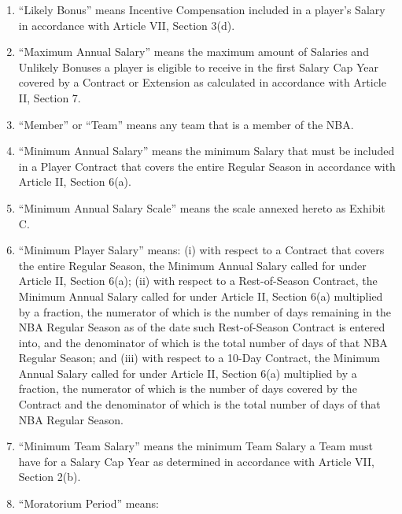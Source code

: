 \documentclass[
]{book}
\begin{document}
\begin{enumerate}
\item
  ``Likely Bonus'' means Incentive Compensation included in a player's Salary in accordance with Article VII, Section 3(d).
\item
  ``Maximum Annual Salary'' means the maximum amount of Salaries and Unlikely Bonuses a player is eligible to receive in the first Salary Cap Year covered by a Contract or Extension as calculated in accordance with Article II, Section 7.
\item
  ``Member'' or ``Team'' means any team that is a member of the NBA.
\item
  ``Minimum Annual Salary'' means the minimum Salary that must be included in a Player Contract that covers the entire Regular Season in accordance with Article II, Section 6(a).
\item
  ``Minimum Annual Salary Scale'' means the scale annexed hereto as Exhibit C.
\item
  ``Minimum Player Salary'' means: (i) with respect to a Contract that covers the entire Regular Season, the Minimum Annual Salary called for under Article II, Section 6(a); (ii) with respect to a Rest-of-Season Contract, the Minimum Annual Salary called for under Article II, Section 6(a) multiplied by a fraction, the numerator of which is the number of days remaining in the NBA Regular Season as of the date such Rest-of-Season Contract is entered into, and the denominator of which is the total number of days of that NBA Regular Season; and (iii) with respect to a 10-Day Contract, the Minimum Annual Salary called for under Article II, Section 6(a) multiplied by a fraction, the numerator of which is the number of days covered by the Contract and the denominator of which is the total number of days of that NBA Regular Season.
\item
  ``Minimum Team Salary'' means the minimum Team Salary a Team must have for a Salary Cap Year as determined in accordance with Article VII, Section 2(b).
\item
  ``Moratorium Period'' means:


\end{enumerate}
\end{document}
